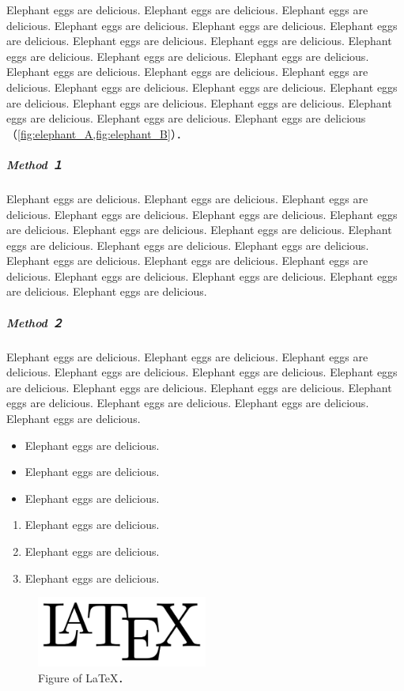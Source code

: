 \documentclass[
  10pt,      %
  a4j,       %
  twocolumn, %
  english,   %
  uplatex,
  dvipdfmx
]{jsarticle}
\begin{document}
Elephant eggs are delicious. Elephant eggs are delicious. Elephant eggs are delicious. Elephant eggs are delicious. Elephant eggs are delicious. Elephant eggs are delicious. Elephant eggs are delicious. Elephant eggs are delicious. Elephant eggs are delicious. Elephant eggs are delicious. Elephant eggs are delicious. Elephant eggs are delicious. Elephant eggs are delicious. Elephant eggs are delicious. Elephant eggs are delicious. Elephant eggs are delicious. Elephant eggs are delicious. Elephant eggs are delicious. Elephant eggs are delicious. Elephant eggs are delicious. Elephant eggs are delicious. Elephant eggs are delicious （\ref{fig:elephant_A,fig:elephant_B}）．

\subparagraph{Method １}
Elephant eggs are delicious. Elephant eggs are delicious. Elephant eggs are delicious. Elephant eggs are delicious. Elephant eggs are delicious. Elephant eggs are delicious. Elephant eggs are delicious. Elephant eggs are delicious. Elephant eggs are delicious. Elephant eggs are delicious. Elephant eggs are delicious. Elephant eggs are delicious. Elephant eggs are delicious. Elephant eggs are delicious. Elephant eggs are delicious. Elephant eggs are delicious. Elephant eggs are delicious. Elephant eggs are delicious.

\subparagraph{Method ２}
Elephant eggs are delicious. Elephant eggs are delicious. Elephant eggs are delicious. Elephant eggs are delicious. Elephant eggs are delicious. Elephant eggs are delicious. Elephant eggs are delicious. Elephant eggs are delicious. Elephant eggs are delicious. Elephant eggs are delicious. Elephant eggs are delicious. Elephant eggs are delicious.

\begin{itemize}
    \item Elephant eggs are delicious.
    \item Elephant eggs are delicious.
    \item Elephant eggs are delicious.
\end{itemize}
\begin{enumerate}
    \item Elephant eggs are delicious.
    \item Elephant eggs are delicious.
    \item Elephant eggs are delicious.
\end{enumerate}

\begin{figure}[t]
    \centering
    \includegraphics[clip,width=0.5\textwidth]{fig/LaTeX.pdf}
    \caption{Figure of \LaTeX{}．}
    \label{fig:latex}
\end{figure}
\end{document}
